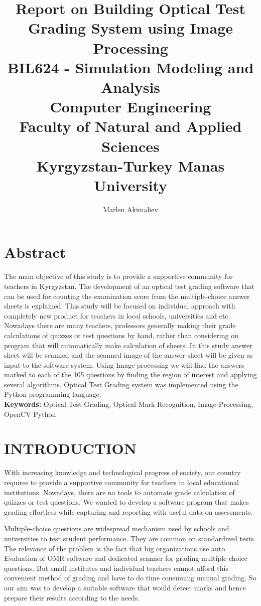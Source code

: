 \documentclass[a4paper,10pt]{article}
\title{Report on Building Optical Test Grading System using Image Processing\\
\large BIL624 - Simulation Modeling and Analysis\\Computer Engineering\\Faculty of Natural and Applied Sciences\\Kyrgyzstan-Turkey Manas University}
\author{Marlen Akimaliev}
\begin{document}
\maketitle
\section*{Abstract}
The main objective of this study is to provide a supportive community for teachers in Kyrgyzstan. The development of an optical test grading software that can be used for counting the examination score from the multiple-choice answer sheets is explained. This study will be focused on individual approach with completely new product for teachers in local schools, universities and etc. Nowadays there are many teachers, professors generally making their grade calculations of quizzes or test questions by hand, rather than considering on program that will automatically make calculation of sheets. In this study answer sheet will be scanned and the scanned image of the answer sheet will be given as input to the software system. Using Image processing we will find the answers marked to each of the 105 questions by finding the region of interest and applying several algorithms. Optical Test Grading system was implemented using the Python programming language.\\
\textbf{Keywords:} Optical Test Grading, Optical Mark Recognition, Image Processing, OpenCV Python
\section{INTRODUCTION}
With increasing knowledge and technological progress of society, our country requires to provide a supportive community for teachers in local educational institutions. Nowadays, there are no tools to automate grade calculation of quizzes or test questions. We wanted to develop a software program that makes grading effortless while capturing and reporting with useful data on assessments.

Multiple-choice questions are widespread mechanism used by schools and universities to test student performance. They are common on standardized tests. The relevance of the problem is the fact that big organizations use auto Evaluation of OMR software and dedicated scanner for grading multiple choice questions. But small institutes and individual teachers cannot afford this convenient method of grading and have to do time consuming manual grading. So our aim was to develop a suitable software that would detect marks and hence prepare their results according to the needs.
\end{document}
